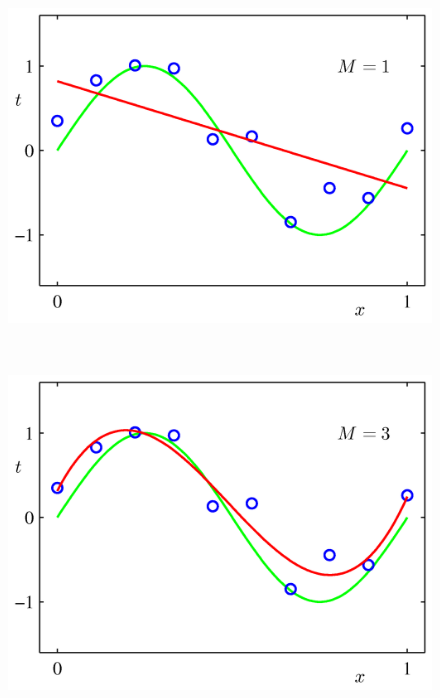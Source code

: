 \documentclass[b5paper]{book}
\numberwithin{equation}{chapter}
\begin{document}
{\begin{figure}[ht]
\begin{minipage}[t]{0.5\linewidth}
		\label{fig:1-4a}
		\end{minipage}
		\begin{minipage}[t]{0.5\linewidth}
		\includegraphics[scale=0.8]{Images/1-4b.png}
		\label{fig:1-4b}
		\end{minipage} \\
		\begin{minipage}[t]{0.5\linewidth}
		\includegraphics[scale=0.8]{Images/1-4c.png}
		\label{fig:1-4c}
		\end{minipage}
		\begin{minipage}[t]{0.5\linewidth}

\end{minipage}
\end{figure}}
\end{document}
